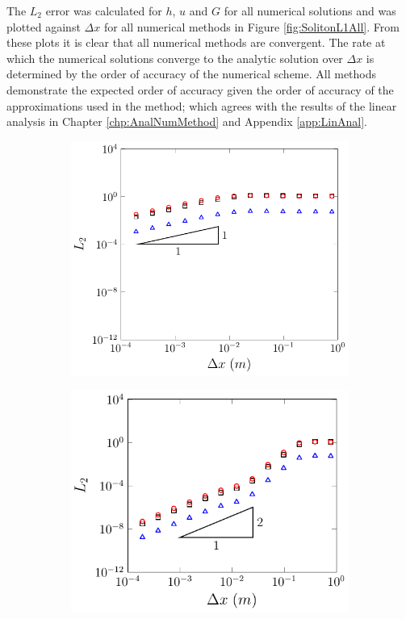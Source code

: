 The $L_2$ error was calculated for $h$, $u$ and $G$ for all numerical solutions and was plotted against $\Delta x$ for all numerical methods in Figure \ref{fig:SolitonL1All}. From these plots it is clear that all numerical methods are convergent. The rate at which the numerical solutions converge to the analytic solution over $\Delta x$ is determined by the order of accuracy of the numerical scheme. All methods demonstrate the expected order of accuracy given the order of accuracy of the approximations used in the method; which agrees with the results of the linear analysis in Chapter \ref{chp:AnalNumMethod} and Appendix \ref{app:LinAnal}. 
\begin{figure}
	\centering
	\begin{subfigure}{0.5\textwidth}
		\includegraphics[width=\textwidth]{./chp5/figures/Analytic/Soliton/L2/FDVM1.pdf}
		\vspace{0.5cm}
	\end{subfigure}%
	\begin{subfigure}{0.5\textwidth}
		\includegraphics[width=\textwidth]{./chp5/figures/Analytic/Soliton/L2/FDVM2.pdf}

\end{subfigure}
\end{figure}
